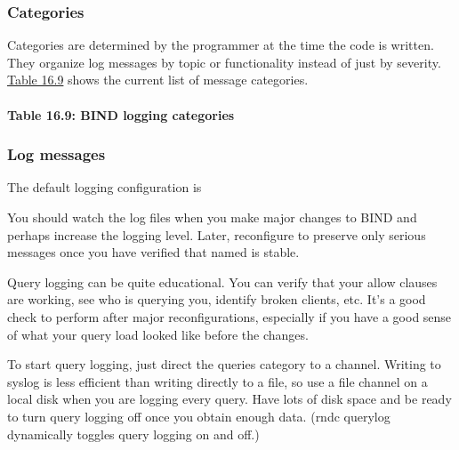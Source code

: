 
\subsubsection[Categories]{\texorpdfstring{\protect\hypertarget{part0024_split_070.htmlux5cux23_idTextAnchor959}{}{}Categories}{Categories}}

Categories are determined by the programmer at the time the code is
written. They organize log messages by topic or functionality instead of
just by severity.
\protect\hyperlink{part0024_split_070.htmlux5cux23_idTextAnchor960}{Table
16.9} shows the current list of message categories.

\paragraph[{Table 16.9: }BIND logging categories]{\texorpdfstring{{Table
16.9:
}\protect\hypertarget{part0024_split_070.htmlux5cux23_idTextAnchor960}{}{}BIND
logging
categories\protect\hypertarget{part0024_split_070.htmlux5cux23_idIndexMarker2287}{}{}}{Table 16.9: BIND logging categories}}


\subsubsection[Log
messages]{\texorpdfstring{\protect\hypertarget{part0024_split_070.htmlux5cux23_idTextAnchor961}{}{}Log
messages}{Log messages}}

The default logging configuration is


You should watch the log files when you make major changes to BIND and
perhaps increase the logging level. Later, reconfigure to preserve only
serious messages once you have verified that {named} is stable.

Query logging can be quite educational. You can verify that your {allow}
clauses are working, see who is querying you, identify broken clients,
etc. It's a good check to perform after major reconfigurations,
especially if you have a good sense of what your query load looked like
before the changes.

To start query logging, just direct the {queries} category to a channel.
Writing to syslog is less efficient than writing directly to a file, so
use a file channel on a local disk when you are logging every query.
Have lots of disk space and be ready to turn query logging off once you
obtain enough data. ({rndc querylog} dynamically toggles query logging
on and off.)

